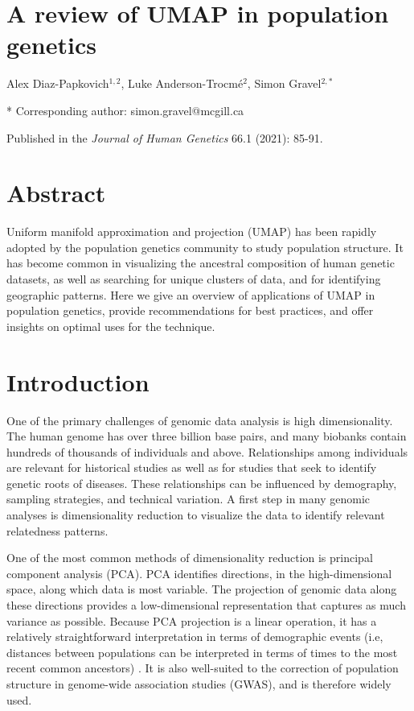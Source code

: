 \section*{A review of UMAP in population genetics}

Alex Diaz-Papkovich$^{1,2}$, Luke Anderson-Trocm\'{e}$^{2}$, Simon Gravel$^{2,*}$


* Corresponding author: simon.gravel@mcgill.ca

Published in the \textit{Journal of Human Genetics} 66.1 (2021): 85-91.

\section{Abstract}

Uniform manifold approximation and projection (UMAP) has been rapidly adopted by the population genetics community to study population structure. It has become common in visualizing the ancestral composition of human genetic datasets, as well as searching for unique clusters of data, and for identifying geographic patterns. Here we give an overview of applications of UMAP in population genetics, provide recommendations for best practices, and offer insights on optimal uses for the technique.

\section{Introduction}
One of the primary challenges of genomic data analysis is high dimensionality. The human genome has over three billion base pairs, and many biobanks contain hundreds of thousands of individuals and above. Relationships among individuals are relevant for historical studies as well as for studies that seek to identify genetic roots of diseases. These relationships can be influenced by demography, sampling strategies, and technical variation. A first step in many genomic analyses is dimensionality reduction to visualize the data to identify relevant relatedness patterns. 

One of the most common methods of dimensionality reduction is principal component analysis (PCA). PCA identifies directions, in the high-dimensional space, along which data is most variable. The projection of genomic data along these directions provides a low-dimensional representation that captures as much variance as possible. Because PCA projection is a linear operation, it has a relatively straightforward interpretation in terms of demographic events (i.e, distances between populations can be interpreted in terms of times to the most recent common ancestors) \citep{mcvean2009genealogical}.  It is also well-suited to the correction of population structure in genome-wide association studies (GWAS)\citep{patterson2006population}, and is therefore widely used.

